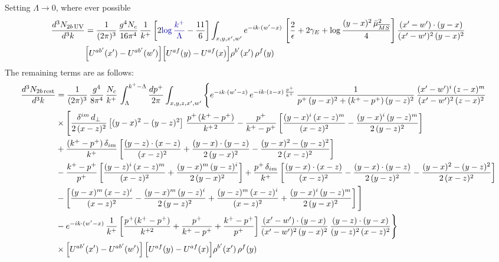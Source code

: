 \documentclass[9pt]{article}
\numberwithin{equation}{section}
\begin{document}
Setting $\Lambda\to 0$, where ever possible
\begin{align}
\frac{d^{3}N_{2b\,\rm UV}}{d^{3}k}&=\frac{1}{(2\pi)^{3}}\,\frac{g^{4}N_{c}}{16\pi^{4}}\,\frac{1}{k^{+}}\left[2{\color{blue}\log\frac{k^{+}}{\Lambda}}-\frac{11}{6}\right]\int_{x,y,x',w'}e^{-ik\cdot(w'-x)}\,\left[\frac{2}{\epsilon}+2\gamma_{E}+\log\frac{(y-x)^{2}\,\bar\mu^{2}_{\overline{MS}}}{4}\right]\frac{(x'-w')\cdot(y-x)}{(x'-w')^{2}\,(y-x)^{2}}\notag \\ & \Big[U^{ab'}(x')-U^{ab'}(w')\Big]\Big[U^{af}(y)-U^{af}(x)\Big]\rho^{b'}(x')\,\rho^{f}(y)
\end{align}   
The remaining terms are as follows: 
\begin{align}
\frac{d^{3}N_{2b\,\rm rest}}{d^{3}k}&=\frac{1}{(2\pi)^{3}}\,\frac{g^{4}}{8\pi^{4}}\,\frac{N_{c}}{k^{+}}\,\int_{\Lambda}^{k^{+}-\Lambda}\frac{dp^{+}}{2\pi}\int_{x,y,z,x',w'}\Bigg\{e^{-ik\cdot(w'-z)}\,e^{-ik\cdot(z-x)\,\frac{p^{+}}{k^{+}}}\,\frac{1}{p^{+}\,(y-x)^{2}+(k^{+}-p^{+})\,(y-z)^{2}}\,\frac{(x'-w')^{i}\,(z-x)^{m}}{(x'-w')^{2}\,(z-x)^{2}}\notag\\
&\times\Bigg[\frac{\delta^{im}\,d_{\perp}}{2\,(x-z)^{2}}\left[(y-x)^{2}-(y-z)^{2}\right]\,\frac{p^{+}\,(k^{+}-p^{+})}{k^{+\,2}}-\frac{p^{+}}{k^{+}-p^{+}}\left[\frac{(y-x)^{i}\,(x-z)^{m}}{(x-z)^{2}}-\frac{(y-x)^{i}\,(y-z)^{m}}{2\,(y-z)^{2}}\right]\notag\\
&+\frac{(k^{+}-p^{+})\,\delta_{im}}{k^{+}}\left[\frac{(y-z)\cdot(x-z)}{(x-z)^{2}}+\frac{(y-x)\cdot(y-z)}{2\,(y-x)^{2}}-\frac{(y-x)^{2}-(y-z)^{2}}{2\,(x-z)^{2}}\right]
\notag \\ & -\frac{k^{+}-p^{+}}{p^{+}}\left[\frac{(y-z)^{i}\,(x-z)^{m}}{(x-z)^{2}}+\frac{(y-x)^{m}\,(y-z)^{i}}{2\,(y-x)^{2}}\right]+\frac{p^{+}\,\delta_{im}}{k^{+}}\left[\frac{(y-x)\cdot(x-z)}{(x-z)^{2}}-\frac{(y-x)\cdot(y-z)}{2\,(y-z)^{2}}-\frac{(y-x)^{2}-(y-z)^{2}}{2\,(x-z)^{2}}\right]\notag\\
&-\left[\frac{(y-x)^{m}\,(x-z)^{i}}{(x-z)^{2}}-\frac{(y-x)^{m}\,(y-z)^{i}}{2\,(y-z)^{2}}+\frac{(y-z)^{m}\,(x-z)^{i}}{(x-z)^{2}}+\frac{(y-x)^{i}\,(y-z)^{m}}{2\,(y-x)^{2}}\right]\Bigg]\notag\\
&-e^{-ik\cdot(w'-x)}\,\frac{1}{k^{+}}\left[\frac{p^{+}(k^{+}-p^{+})}{k^{+2}}+\frac{p^{+}}{k^{+}-p^{+}}+\frac{k^{+}-p^{+}}{p^{+}}\right]\frac{(x'-w')\cdot(y-x)}{(x'-w')^{2}\,(y-x)^{2}}\,\frac{(y-z)\cdot(y-x)}{(y-z)^{2}\,(x-z)^{2}}\Bigg\}\notag\\
&\times\Big[U^{ab'}(x')-U^{ab'}(w')\Big]\,\Big[U^{af}(y)-U^{af}(x)\Big]\rho^{b'}(x')\,\rho^{f}(y)
\end{align}
\end{document}
